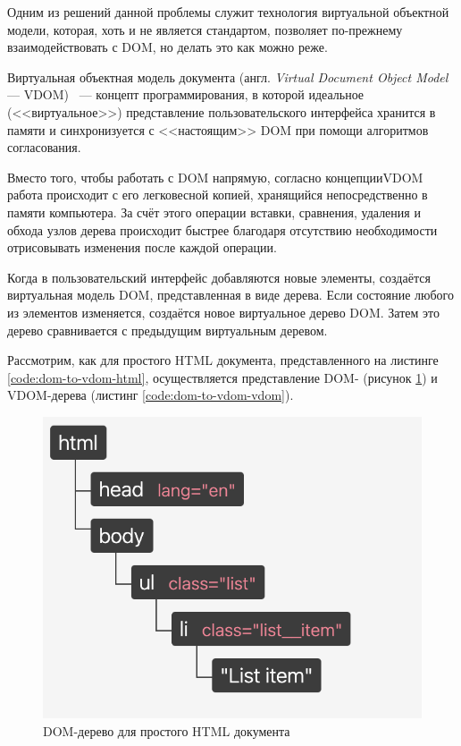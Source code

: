 Одним из решений данной проблемы служит технология виртуальной объектной модели, которая, хоть  и не является стандартом, позволяет по-прежнему взаимодействовать с DOM, но делать это как можно реже.

Виртуальная объектная модель документа (англ. \textit{Virtual Document Object Model} --- VDOM)~\cite{vdom} ---  концепт программирования, в которой идеальное (<<виртуальное>>) представление пользовательского интерфейса хранится в памяти и синхронизуется с <<настоящим>> DOM при помощи алгоритмов согласования.

Вместо того, чтобы работать с DOM напрямую, согласно концепции\break VDOM работа происходит с его легковесной копией, хранящийся непосредственно в памяти компьютера.
За счёт этого операции вставки, сравнения, удаления и обхода узлов дерева происходит быстрее благодаря отсутствию необходимости отрисовывать изменения после каждой операции.

Когда в пользовательский интерфейс добавляются новые элементы, создаётся виртуальная модель DOM, представленная в виде дерева.
Если состояние любого из элементов изменяется, создаётся новое виртуальное дерево DOM.
Затем это дерево сравнивается с предыдущим виртуальным деревом.


Рассмотрим, как для простого  HTML документа, представленного на листинге \ref{code:dom-to-vdom-html}, осуществляется представление DOM- (рисунок \ref{fig:dom-to-vdom-dom}) и VDOM-дерева (листинг \ref{code:dom-to-vdom-vdom}).


\begin{figure}[h]
	\centering
	\includegraphics[width=140mm]{img/dom-to-vdom-dom.png}
	\caption{DOM-дерево для простого HTML документа}
	\label{fig:dom-to-vdom-dom}
\end{figure}

